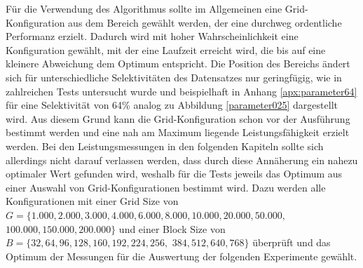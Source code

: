 Für die Verwendung des Algorithmus sollte im Allgemeinen eine Grid-Konfiguration aus dem Bereich gewählt werden, der eine durchweg ordentliche Performanz erzielt.
Dadurch wird mit hoher Wahrscheinlichkeit eine Konfiguration gewählt, mit der eine Laufzeit erreicht wird, die bis auf eine kleinere Abweichung dem Optimum entspricht.
Die Position des Bereichs ändert sich für unterschiedliche Selektivitäten des Datensatzes nur geringfügig, wie in zahlreichen Tests untersucht wurde und beispielhaft in Anhang \ref{apx:parameter64} für eine Selektivität von 64\% analog zu Abbildung \ref{parameter025} dargestellt wird.
Aus diesem Grund kann die Grid-Konfiguration schon vor der Ausführung bestimmt werden und eine nah am Maximum liegende Leistungsfähigkeit erzielt werden.
Bei den Leistungsmessungen in den folgenden Kapiteln sollte sich allerdings nicht darauf verlassen werden, dass durch diese Annäherung ein nahezu optimaler Wert gefunden wird, weshalb für die Tests jeweils das Optimum aus einer Auswahl von Grid-Konfigurationen bestimmt wird.
Dazu werden alle Konfigurationen mit einer Grid Size von $G=\{1.000, 2.000, 3.000, 4.000, 6.000, 8.000, 10.000, 20.000, 50.000,$ $100.000, 150.000, 200.000\}$ und einer Block Size von $B=\{32, 64, 96, 128, 160, 192, 224, 256,$ $384, 512, 640, 768\}$ überprüft und das Optimum der Messungen für die Auswertung der folgenden Experimente gewählt.